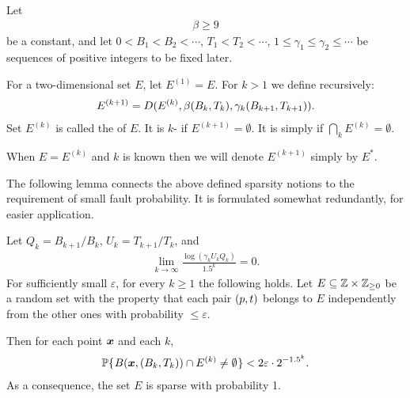 \documentclass[12pt]{memoir}
\renewcommand{\le}{\leq}
\renewcommand{\ge}{\geq}
\def\B{B}
\def\U{U}
\newcommand{\Tu}{T}
\begin{document}
\begin{definition}[Sparsity]\label{def:sparsity}
Let
\begin{align}\label{eq:beta}
 \beta\ge 9 
 \end{align}
be a constant, and let 
\( 0<\B_{1}<\B_{2}<\dotsm \), \( \Tu_{1}<\Tu_{2}<\dotsm \), 
\( 1\le\gamma_{1}\le\gamma_{2}\le\dotsm \) be 
sequences of positive integers to be fixed later.

For a two-dimensional set \( E \), let \( E^{(1)} = E \).
For \( k>1 \) we define recursively:
\begin{align}\label{eq:noise^k}
    E^{(k+1)} = D(E^{(k)}, \beta\pair{\B_k}{\Tu_{k}}, \gamma_{k}\pair{\B_{k+1}}{\Tu_{k+1}}).
\end{align}
Set \( E^{(k)} \) is called the  of \( E \).
It is \( k \)- if \( E^{(k+1)}=\emptyset \).
It is simply  if \( \bigcap_{k}E^{(k)}=\emptyset \).

When \( E=E^{(k)} \) and \( k \) is known
then we will denote \( E^{(k+1)} \) simply by \( E^{*} \).
\end{definition}

The following lemma connects the above defined sparsity notions to the requirement
of small fault probability.
It is formulated somewhat redundantly, for easier application.

\begin{lemma}[Sparsity]\label{lem:sparsiness}
Let \( Q_k = \B_{k+1}/\B_{k} \), \( \U_k = \Tu_{k+1}/\Tu_{k} \), and
\begin{align}\label{eq:assumption}
  \lim_{k\rightarrow\infty}\frac{\log(\gamma_{k}\U_{k} Q_k)}{1.5^k}=0.
\end{align}
For sufficiently small \( \varepsilon \), for every \( k\ge 1 \) the following holds.
Let \( E\subseteq \bbZ\times \bbZ_{\ge 0} \)
be a random set with the property that each pair \( (p,t) \) belongs to \( E \)
independently from the other ones with probability \( \le \varepsilon \).

Then for each point \( \boldsymbol{x} \)  and each \( k \),
 \begin{align*}
   \Pbof{B(\vek{x},(\B_k, \Tu_{k}))\cap E^{(k)}\neq\emptyset} <2\varepsilon \cdot 2^{-1.5^{k}}.
 \end{align*}
As a consequence, the set \( E \) is sparse with probability 1.
\end{lemma}
\end{document}
